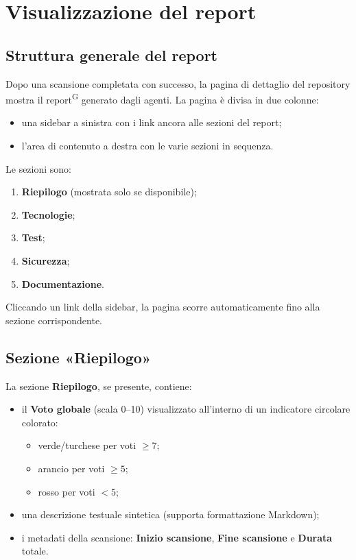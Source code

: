 \documentclass[a4paper, 11pt]{article}
\begin{document}
\section{Visualizzazione del report}

\subsection{Struttura generale del report}
Dopo una scansione completata con successo, la pagina di dettaglio del repository mostra il report\textsuperscript{G} generato dagli agenti. La pagina è divisa in due colonne:
\begin{itemize}
    \item una sidebar a sinistra con i link ancora alle sezioni del report;
    \item l'area di contenuto a destra con le varie sezioni in sequenza.
\end{itemize}

Le sezioni sono:
\begin{enumerate}
    \item \textbf{Riepilogo} (mostrata solo se disponibile);
    \item \textbf{Tecnologie};
    \item \textbf{Test};
    \item \textbf{Sicurezza};
    \item \textbf{Documentazione}.
\end{enumerate}

\noindent Cliccando un link della sidebar, la pagina scorre automaticamente fino alla sezione corrispondente.

\subsection{Sezione «Riepilogo»}
La sezione \textbf{Riepilogo}, se presente, contiene:
\begin{itemize}
    \item il \textbf{Voto globale} (scala 0--10) visualizzato all'interno di un indicatore circolare colorato:
    \begin{itemize}
        \item verde/turchese per voti $\geq 7$;
        \item arancio per voti $\geq 5$;
        \item rosso per voti $< 5$;
    \end{itemize}
    \item una descrizione testuale sintetica (supporta formattazione Markdown);
    \item i metadati della scansione: \textbf{Inizio scansione}, \textbf{Fine scansione} e \textbf{Durata} totale.
\end{itemize}
\end{document}
